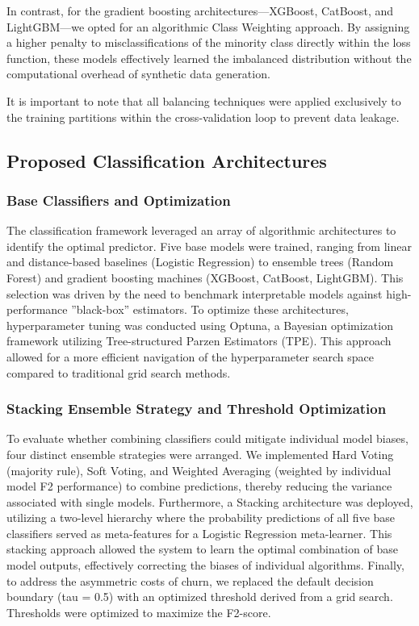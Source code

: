 \documentclass[a4paper,twoside]{article}
\begin{document}
In contrast, for the gradient boosting architectures—XGBoost, CatBoost, and LightGBM—we opted for an algorithmic Class Weighting approach. By assigning a higher penalty to misclassifications of the minority class directly within the loss function, these models effectively learned the imbalanced distribution without the computational overhead of synthetic data generation.

It is important to note that all balancing techniques were applied exclusively to the training partitions within the cross-validation loop to prevent data leakage.

\subsection{Proposed Classification Architectures}

\subsubsection{Base Classifiers and Optimization}

The classification framework leveraged an array of algorithmic architectures to identify the optimal predictor. Five base models were trained, ranging from linear and distance-based baselines (Logistic Regression) to ensemble trees (Random Forest) and gradient boosting machines (XGBoost, CatBoost, LightGBM). This selection was driven by the need to benchmark interpretable models against high-performance ''black-box'' estimators. To optimize these architectures, hyperparameter tuning was conducted using Optuna, a Bayesian optimization framework utilizing Tree-structured Parzen Estimators (TPE). This approach allowed for a more efficient navigation of the hyperparameter search space compared to traditional grid search methods.

\subsubsection{Stacking Ensemble Strategy and Threshold Optimization}

To evaluate whether combining classifiers could mitigate individual model biases, four distinct ensemble strategies were arranged. We implemented Hard Voting (majority rule), Soft Voting, and Weighted Averaging (weighted by individual model F2 performance) to combine predictions, thereby reducing the variance associated with single models. Furthermore, a Stacking architecture was deployed, utilizing a two-level hierarchy where the probability predictions of all five base classifiers served as meta-features for a Logistic Regression meta-learner. This stacking approach allowed the system to learn the optimal combination of base model outputs, effectively correcting the biases of individual algorithms. Finally, to address the asymmetric costs of churn, we replaced the default decision boundary (tau = 0.5) with an optimized threshold derived from a grid search. Thresholds were optimized to maximize the F2-score.
\end{document}

